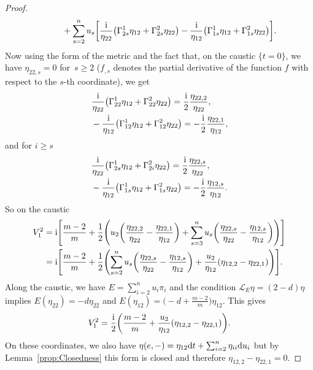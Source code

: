 \documentclass[10pt,a4paper]{amsart}
\numberwithin{equation}{section}
\begin{document}
\begin{proof}
\begin{gather*}
\hphantom{V^{2}_{1}=}{}+\sum_{s=2}^{n}u_{s}\bigg[ \frac{{\rm i}}{\eta_{22}}\bigl(\Gamma_{2s}^{1}\eta_{12}+\Gamma_{2s}^{2}\eta_{22} \bigr)-\frac{{\rm i}}{\eta_{12}}\bigl(\Gamma_{1s}^{1}\eta_{12}+\Gamma_{1s}^{2}\eta_{22} \bigr)\bigg].
\end{gather*}
 Now using the form of the metric and the fact that, on the caustic $\{ t=0 \}$, we have $\eta_{22,s}=0$ for~$s\geq 2$ ($f_{,s}$ denotes the partial derivative of the function $f$ with respect to the $s$-th coordinate), we get
 \begin{align*}
 &\frac{{\rm i}}{\eta_{22}}\bigl(\Gamma_{22}^{1}\eta_{12}+\Gamma_{22}^{2}\eta_{22} \bigr)=\frac{{\rm i}}{2}\frac{\eta_{22,2}}{\eta_{22}},\\
 &-\frac{{\rm i}}{\eta_{12}}\bigl(\Gamma_{12}^{1}\eta_{12}+\Gamma_{12}^{2}\eta_{22} \bigr)=-\frac{{\rm i}}{2}\frac{\eta_{22,1}}{\eta_{12}},
 \end{align*}
 and for $i\geq s$
 \begin{align*}
 &\frac{{\rm i}}{\eta_{22}}\bigl(\Gamma_{2s}^{1}\eta_{12}+\Gamma_{2i}^{2}\eta_{22} \bigr)=\frac{{\rm i}}{2}\frac{\eta_{22,s}}{\eta_{22}},\\
 &-\frac{{\rm i}}{\eta_{12}}\bigl(\Gamma_{1s}^{1}\eta_{12}+\Gamma_{1s}^{2}\eta_{22} \bigr)=-\frac{{\rm i}}{2}\frac{\eta_{12,s}}{\eta_{12}}.
 \end{align*}
 So on the caustic
 \begin{align*}
 V_{1}^{2}&={\rm i}\Bigg[ \frac{m-2}{m}+\frac{1}{2}\Biggl( u_{2}\biggl( \frac{\eta_{22,2}}{\eta_{22}}-\frac{\eta_{22,1}}{\eta_{12}}\biggr)+\sum_{s=3}^{n}u_{s}\biggl( \frac{\eta_{22,s}}{\eta_{22}}-\frac{\eta_{12,s}}{\eta_{12}}\biggr)\Biggr)\Bigg]\\
 &={\rm i}\Bigg[ \frac{m-2}{m}+\frac{1}{2}\Biggl( \sum_{s=2}^{n}u_{s}\biggl( \frac{\eta_{22,s}}{\eta_{22}}-\frac{\eta_{12,s}}{\eta_{12}}\biggr)+\frac{u_{2}}{\eta_{12}}(\eta_{12,2}-\eta_{22,1})\Biggr)\Bigg].
 \end{align*}
 Along the caustic, we have $E=\sum_{i=2}^{n}u_{i}\pi_{i}$ and the condition $\mathcal{L}_{E}\eta=(2-d)\eta$ implies $E(\eta_{22})=-d\eta_{22}$ and $E(\eta_{12})=\bigl(-d+\frac{m-2}{m}\bigr)\eta_{12}$. This gives
 \begin{equation*}
 V^{2}_{1}=\frac{{\rm i}}{2}\biggl( \frac{m-2}{m}+\frac{u_{2}}{\eta_{12}}(\eta_{12,2}-\eta_{22,1})\biggr).
 \end{equation*}
On these coordinates, we also have $\eta(e,-)=\eta_{12}{\rm d}t+\sum_{i=2}^{n}\eta_{ii}{\rm d}u_{i}$ but by Lemma~\ref{prop:Closedness} this form is closed and therefore $\eta_{12,2}-\eta_{22,1}=0$.
\end{proof}
\end{document}
